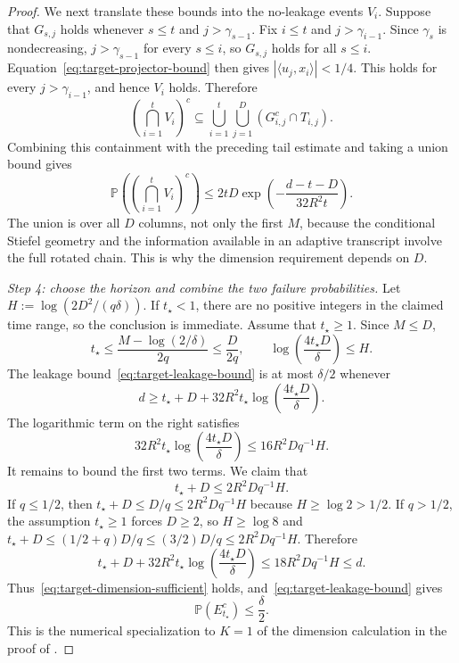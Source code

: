 \documentclass[11pt]{article}
\newcommand{\Pbb}{\mathbb{P}}
\begin{document}
\begin{proof}
We next translate these bounds into the no-leakage events \(V_i\). Suppose that
\(G_{s,j}\) holds whenever \(s\le t\) and \(j>\gamma_{s-1}\). Fix \(i\le t\) and
\(j>\gamma_{i-1}\). Since \(\gamma_s\) is nondecreasing, \(j>\gamma_{s-1}\) for every \(s\le i\), so
\(G_{s,j}\) holds for all \(s\le i\). Equation~\eqref{eq:target-projector-bound} then gives
\(|\langle u_j,x_i\rangle|<1/4\). This holds for every \(j>\gamma_{i-1}\), and hence \(V_i\) holds. Therefore
\[
\left(\bigcap_{i=1}^tV_i\right)^c
\subseteq
\bigcup_{i=1}^t\bigcup_{j=1}^D
\left(G_{i,j}^c\cap T_{i,j}\right).
\]
Combining this containment with the preceding tail estimate and taking a union bound gives
\begin{equation}
\label{eq:target-leakage-bound}
\Pbb\left(\left(\bigcap_{i=1}^tV_i\right)^c\right)
\le
2tD\exp\left(-\frac{d-t-D}{32R^2t}\right).
\end{equation}
The union is over all $D$ columns, not only the first $M$, because the conditional Stiefel geometry and the information
available in an adaptive transcript involve the full rotated chain. This is why the dimension requirement depends on
$D$.

\emph{Step 4: choose the horizon and combine the two failure probabilities.}
Let $H:=\log(2D^2/(q\delta))$.
If $t_\star<1$, there are no positive integers in the claimed time range, so the conclusion is immediate. Assume
that $t_\star\ge1$. Since $M\le D$,
\[
t_\star
\le \frac{M-\log(2/\delta)}{2q}
\le \frac{D}{2q},
\qquad
\log\left(\frac{4t_\star D}{\delta}\right)\le H.
\]
The leakage bound~\eqref{eq:target-leakage-bound} is at most \(\delta/2\) whenever
\begin{equation}
\label{eq:target-dimension-sufficient}
d
\ge
t_\star+D
+32R^2t_\star\log\left(\frac{4t_\star D}{\delta}\right).
\end{equation}
The logarithmic term on the right satisfies
\[
32R^2t_\star\log\left(\frac{4t_\star D}{\delta}\right)
\le16R^2Dq^{-1}H.
\]
It remains to bound the first two terms. We claim that
\[
t_\star+D\le 2R^2Dq^{-1}H.
\]
If \(q\le1/2\), then
\(t_\star+D\le D/q\le2R^2Dq^{-1}H\) because \(H\ge\log2>1/2\). If \(q>1/2\), the assumption
\(t_\star\ge1\) forces \(D\ge2\), so \(H\ge\log8\) and
\(t_\star+D\le(1/2+q)D/q\le(3/2)D/q\le2R^2Dq^{-1}H\). Therefore
\[
 t_\star+D
 +32R^2t_\star\log\left(\frac{4t_\star D}{\delta}\right)
 \le18R^2Dq^{-1}H
 \le d.
\]
Thus~\eqref{eq:target-dimension-sufficient} holds, and~\eqref{eq:target-leakage-bound} gives
\[
\Pbb(E_{t_\star}^c)\le\frac\delta2.
\]
This is the numerical specialization to \(K=1\) of the dimension calculation in the proof of
\citet[Lemma~5]{ArjevaniEtAl2019}.


\end{proof}
\end{document}
